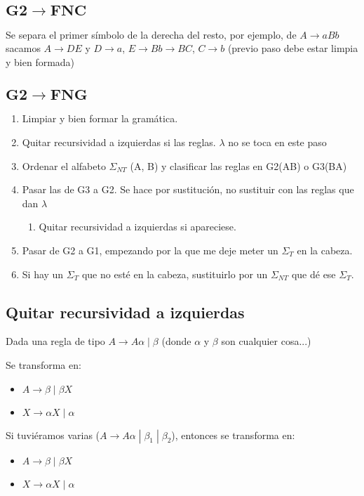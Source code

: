 \documentclass[12pt, twoside, openright]{report} %
\begin{document}
\subsection{$\boldsymbol{G2 \rightarrow FNC}$}
Se separa el primer símbolo de la derecha del resto, por ejemplo, de $A \rightarrow aBb$ sacamos $A \rightarrow DE$ y $D \rightarrow a$, $E \rightarrow Bb \rightarrow BC$, $C \rightarrow b$ (previo paso debe estar limpia y bien formada)

\subsection{$\boldsymbol{G2 \rightarrow FNG}$}
\begin{enumerate}
	\item Limpiar y bien formar la gramática.
	\item Quitar recursividad a izquierdas si las reglas. $\lambda$ no se toca en este paso
	\item Ordenar el alfabeto $\Sigma_{NT}$ (A, B) y clasificar las reglas en G2(AB) o G3(BA)
	\item Pasar las de G3 a G2. Se hace por sustitución, no sustituir con las reglas que dan $\lambda$
	      \begin{enumerate}
		      \item Quitar recursividad a izquierdas si apareciese.
	      \end{enumerate}
	\item Pasar de G2 a G1, empezando por la que me deje meter un $\Sigma_T$ en la cabeza.
	\item Si hay un $\Sigma_T$ que no esté en la cabeza, sustituirlo por un $\Sigma_{NT}$ que dé ese $\Sigma_T$.
\end{enumerate}

\subsection{Quitar recursividad a izquierdas}
Dada una regla de tipo $A \rightarrow A\alpha \; | \; \beta$ (donde $\alpha$ y $\beta$ son cualquier cosa...)

Se transforma en:
\begin{itemize}
	\item $A \rightarrow \beta \; | \; \beta X$
	\item $X \rightarrow \alpha X \; | \; \alpha$
\end{itemize}
Si tuviéramos varias ($A \rightarrow A\alpha \; | \; \beta_1 \; | \; \beta_2$), entonces se transforma en:
\begin{itemize}
	\item $A \rightarrow \beta \; | \; \beta X$
	\item $X \rightarrow \alpha X \; | \; \alpha$
\end{itemize}
\end{document}
